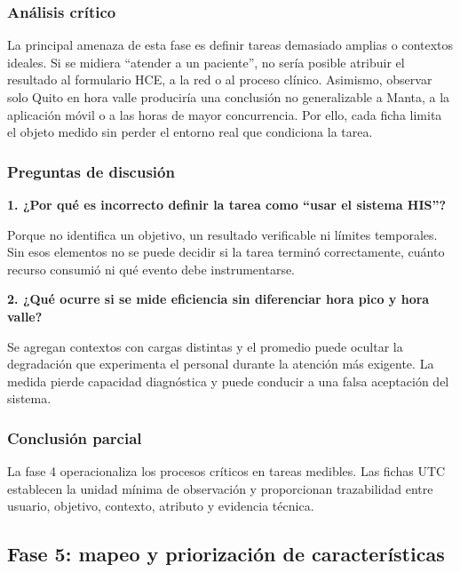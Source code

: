 \subsubsection{Análisis crítico}

La principal amenaza de esta fase es definir tareas demasiado amplias o contextos ideales. Si se midiera ``atender a un paciente'', no sería posible atribuir el resultado al formulario HCE, a la red o al proceso clínico. Asimismo, observar solo Quito en hora valle produciría una conclusión no generalizable a Manta, a la aplicación móvil o a las horas de mayor concurrencia. Por ello, cada ficha limita el objeto medido sin perder el entorno real que condiciona la tarea.

\subsubsection{Preguntas de discusión}

\textbf{1. ¿Por qué es incorrecto definir la tarea como ``usar el sistema HIS''?}

Porque no identifica un objetivo, un resultado verificable ni límites temporales. Sin esos elementos no se puede decidir si la tarea terminó correctamente, cuánto recurso consumió ni qué evento debe instrumentarse.

\textbf{2. ¿Qué ocurre si se mide eficiencia sin diferenciar hora pico y hora valle?}

Se agregan contextos con cargas distintas y el promedio puede ocultar la degradación que experimenta el personal durante la atención más exigente. La medida pierde capacidad diagnóstica y puede conducir a una falsa aceptación del sistema.

\subsubsection{Conclusión parcial}

La fase 4 operacionaliza los procesos críticos en tareas medibles. Las fichas UTC establecen la unidad mínima de observación y proporcionan trazabilidad entre usuario, objetivo, contexto, atributo y evidencia técnica.



\subsection{Fase 5: mapeo y priorización de características}

